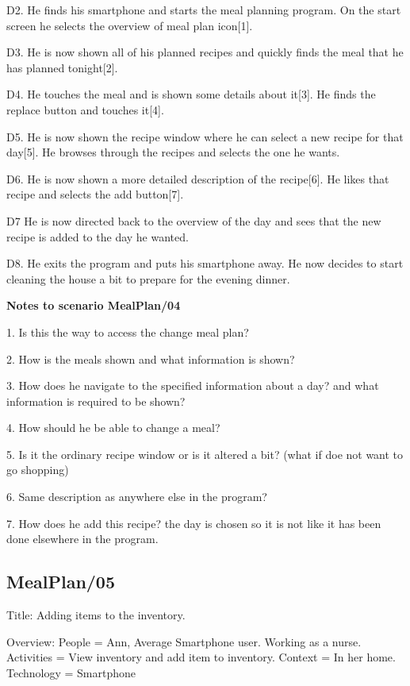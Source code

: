 	D2. He finds his smartphone and starts the meal planning program. On the start screen he selects the overview of meal plan icon[1].
	
	D3. He is now shown all of his planned recipes and quickly finds the meal that he has planned tonight[2].
	
	D4. He touches the meal and is shown some details about it[3]. He finds the replace button and touches it[4].
	
	D5. He is now shown the recipe window where he can select a new recipe for that day[5]. He browses through the recipes and selects the one he wants. 
	
	D6. He is now shown a more detailed description of the recipe[6]. He likes that recipe and selects the add button[7].
	
	D7 He is now directed back to the overview of the day and sees that the new recipe is added to the day he wanted.
	
	D8. He exits the program and puts his smartphone away. He now decides to start cleaning the house a bit to prepare for the evening dinner.
	
\textbf{Notes to scenario MealPlan/04}

1. Is this the way to access the change meal plan?

2. How is the meals shown and what information is shown? 

3. How does he navigate to the specified information about a day? and what information is required to be shown?

4. How should he be able to change a meal?

5. Is it the ordinary recipe window or is it altered a bit? (what if doe not want to go shopping) 

6. Same description as anywhere else in the program?

7. How does he add this recipe? the day is chosen so it is not like it has been done elsewhere in the program.

\subsection{MealPlan/05} \label{MealPlan05}

Title: Adding items to the inventory.

Overview:
	People = Ann, Average Smartphone user. Working as a nurse.
	Activities = View inventory and add item to inventory.
	Context = In her home.
	Technology = Smartphone

